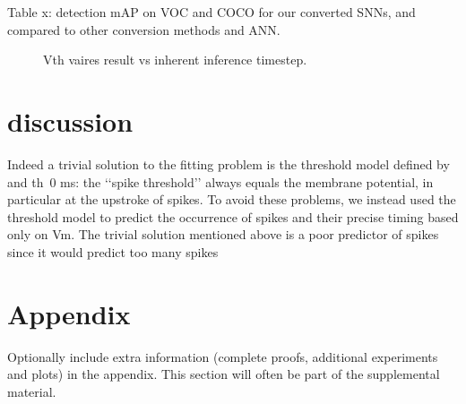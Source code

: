 \documentclass{article}
\begin{document}
Table x: detection mAP on VOC and COCO for our converted SNNs, and compared to other conversion methods and ANN.


\begin{figure}[htbp]
  \centering
  \fbox{\rule[-.5cm]{0cm}{4cm} \rule[-.5cm]{4cm}{0cm}}
  \caption{Vth vaires result vs inherent inference timestep.}
\end{figure}

\section{discussion}

Indeed a trivial solution to
the fitting problem is the threshold model defined by  and th~0 ms: the ‘‘spike threshold’’ always equals
the membrane potential, in particular at the upstroke of spikes.
To avoid these problems, we instead used the threshold model
to predict the occurrence of spikes and their precise timing based
only on Vm. The trivial solution mentioned above is a poor
predictor of spikes since it would predict too many spikes

\newpage




\appendix


\section{Appendix}


Optionally include extra information (complete proofs, additional experiments and plots) in the appendix.
This section will often be part of the supplemental material.
\end{document}
